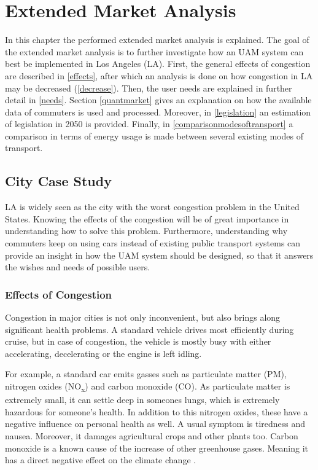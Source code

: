 \newpage

\chapter{Extended Market Analysis}
\label{ch-market}

In this chapter the performed extended market analysis is explained. The goal of the extended market analysis is to further investigate how an UAM system can best be implemented in Los Angeles (LA). First, the general effects of congestion are described in \autoref{effects}, after which an analysis is done on how congestion in LA may be decreased (\autoref{decrease}). Then, the user needs are explained in further detail in \autoref{needs}. Section \ref{quantmarket} gives an explanation on how the available data of commuters is used and processed. Moreover, in \autoref{legislation} an estimation of legislation in 2050 is provided. Finally, in \autoref{comparisonmodesoftransport} a comparison in terms of energy usage is made between several existing modes of transport. 

\section{City Case Study}

LA is widely seen as the city with the worst congestion problem in the United States. Knowing the effects of the congestion will be of great importance in understanding how to solve this problem. Furthermore, understanding why commuters keep on using cars instead of existing public transport systems can provide an insight in how the UAM system should be designed, so that it answers the wishes and needs of possible users.

\subsection{Effects of Congestion}
\label{effects}
Congestion in major cities is not only inconvenient, but also brings along significant health problems. A standard vehicle drives most efficiently during cruise, but in case of congestion, the vehicle is mostly busy with either accelerating, decelerating or the engine is left idling. 

For example, a standard car emits gasses such as particulate matter (PM), nitrogen oxides (NO\textsubscript{x}) and carbon monoxide (CO). As particulate matter is extremely small, it can settle deep in someones lungs, which is extremely hazardous for someone's health. In addition to this nitrogen oxides, these have a negative influence on personal health as well. A usual symptom is tiredness and nausea. Moreover, it damages agricultural crops and other plants too. Carbon monoxide is a known cause of the increase of other greenhouse gases. Meaning it has a direct negative effect on the climate change \cite{cargasses}.

